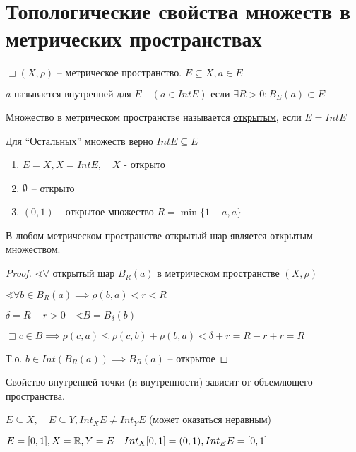 \section{Топологические свойства множеств в метрических пространствах}

\begin{definition}
    $\sqsupset \left( X, \rho \right) $ -- метрическое пространство. $E\subseteq X, a\in E$

   $ 
        a \text{ называется внутренней для } E\quad (a\in Int E) \text{ если } \exists R>0: B_E(a) \subset E
    $ 
\end{definition}

\begin{definition}
    Множество в метрическом пространстве называется \underline{открытым}, если $ E = Int E$

    Для ``Остальных'' множеств верно $Int E \subseteq E$
\end{definition}
\begin{example}
    \begin{enumerate}
        \item $E = X, X = Int E,\quad X$ - открыто
        \item $\emptyset $ -- открыто
        \item $(0,1)$ -- открытое множество $ R = \min \{1-a, a\}$
    \end{enumerate}
\end{example}

\begin{statement}
    В любом метрическом пространстве открытый шар является открытым множеством.
\end{statement}
\begin{proof}
    $\sphericalangle \forall $ открытый шар $B_R(a)$ в метрическом пространстве  $(X, \rho)$

    $\sphericalangle \forall b\in B_R(a) \implies  \rho(b,a)<r<R$

    $\delta = R-r>0\quad \sphericalangle B = B_{\delta}(b)$

    $\sqsupset c\in B \implies  \rho(c,a) \leqslant \rho(c,b) + \rho(b,a) < \delta + r = R-r +r = R$

    Т.о. $b\in Int(B_R(a)) \implies  B_R(a)$ -- открытое
\end{proof}

\begin{note}
    Свойство внутренней точки (и внутренности) зависит от объемлющего пространства. 

    $ E\subseteq X,\quad E\subseteq Y, Int_X E \neq Int_Y E$ (может оказаться неравным)
\end{note}
\begin{example}
    $E = [0,1], X=\mathbb{R}, Y = E\quad Int_X [0,1] = (0,1), Int_E E = [0,1]$
\end{example}

